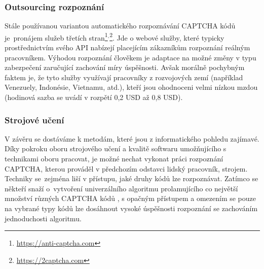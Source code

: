 \documentclass[
  field=ainfp,
  master=true,
  biblatex,
  sourcecodes=false,
  theorems=false,
  glossaries,
  index
]{kidiplom}
\begin{document}
\subsubsection*{Outsourcing rozpoznání}
Stále používanou variantou automatického rozpoznávání CAPTCHA kódů je~pro\-nájem služeb třetích stran\footnote{\url{https://anti-captcha.com}}$^{,}$\footnote{\url{https://2captcha.com}}. Jde o webové služby, které typicky prostřednictvím svého API nabízejí placejícím zákazníkům rozpoznání reálným pracovníkem. Výhodou rozpoznání člověkem je adaptace na možné změny v typu zabez\-pe\-čení zaručující zachování míry úspěšnosti. Avšak morálně pochybným faktem je, že tyto služby využívají pracovníky z rozvojových zemí (například Venezuely, Indonésie, Vietnamu, atd.), kteří jsou ohodnoceni velmi nízkou mzdou (hodinová sazba se uvádí v rozpětí 0,2 USD až 0,8 USD). 

\subsubsection*{Strojové učení}
V závěru se dostáváme k metodám, které jsou z informatického pohledu zajímavé. Díky pokroku oboru strojového učení a kvalitě softwaru umožňujícího s technikami oboru pracovat, je možné nechat vykonat práci rozpoznání CAPTCHA, kterou prováděl v předchozím odstavci lidský pracovník, strojem. Techniky se~zejména liší v přístupu, jaké druhy kódů lze rozpoznávat. Zatímco se někteří snaží o~vytvoření univerzálního algoritmu prolamujícího co největší množství různých CAPTCHA kódů \cite{43464}, s opačným přístupem a omezením se pouze na vybrané typy kódů \citep{Kopp2016HowTM} lze dosáhnout vysoké úspěšnosti rozpoznání se zachováním jednoduchosti algoritmu.
\newpage
\end{document}
